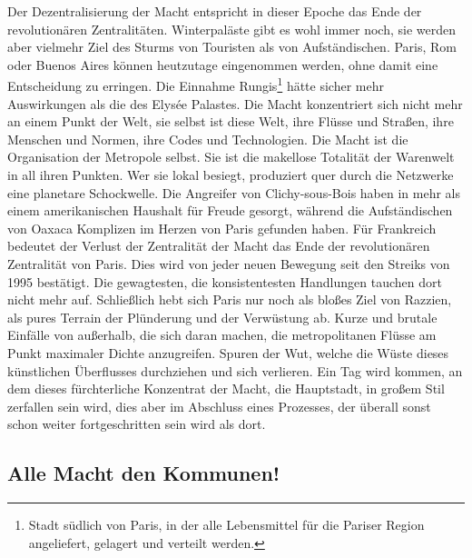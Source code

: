 Der Dezentralisierung der Macht entspricht in dieser Epoche das
Ende der revolutionären Zentralitäten. Winterpaläste gibt es wohl
immer noch, sie werden aber vielmehr Ziel des Sturms von Touristen
als von Aufständischen. Paris, Rom oder Buenos Aires können
heutzutage eingenommen werden, ohne damit eine Entscheidung zu
erringen. Die Einnahme Rungis\footnote{
Stadt südlich von Paris, in der alle Lebensmittel für die
Pariser Region angeliefert, gelagert und verteilt werden.
}
hätte sicher mehr Auswirkungen als
die des Elysée Palastes. Die Macht konzentriert sich nicht mehr an
einem Punkt der Welt, sie selbst ist diese Welt, ihre Flüsse und
Straßen, ihre Menschen und Normen, ihre Codes und Technologien. Die
Macht ist die Organisation der Metropole selbst. Sie ist die
makellose Totalität der Warenwelt in all ihren Punkten. Wer sie
lokal besiegt, produziert quer durch die Netzwerke eine planetare
Schockwelle. Die Angreifer von Clichy-sous-Bois haben in mehr als
einem amerikanischen Haushalt für Freude gesorgt, während die
Aufständischen von Oaxaca Komplizen im Herzen von Paris gefunden
haben. Für Frankreich bedeutet der Verlust der Zentralität der
Macht das Ende der revolutionären Zentralität von Paris. Dies wird
von jeder neuen Bewegung seit den Streiks von 1995 bestätigt. Die
gewagtesten, die konsistentesten Handlungen tauchen dort nicht mehr
auf. Schließlich hebt sich Paris nur noch als bloßes Ziel von
Razzien, als pures Terrain der Plünderung und der Verwüstung ab.
Kurze und brutale Einfälle von außerhalb, die sich daran machen,
die metropolitanen Flüsse am Punkt maximaler Dichte anzugreifen.
Spuren der Wut, welche die Wüste dieses künstlichen Überflusses
durchziehen und sich verlieren. Ein Tag wird kommen, an dem dieses
fürchterliche Konzentrat der Macht, die Hauptstadt, in großem Stil
zerfallen sein wird, dies aber im Abschluss eines Prozesses, der
überall sonst schon weiter fortgeschritten sein wird als dort.

\subsection{Alle Macht den Kommunen!}

